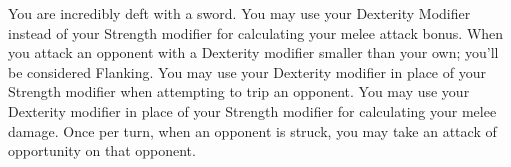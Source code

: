 \combatfeat
{You are incredibly deft with a sword.}
{You may use your Dexterity Modifier instead of your Strength modifier for calculating your melee attack bonus.}
{When you attack an opponent with a Dexterity modifier smaller than your own; you'll be considered Flanking.}
{You may use your Dexterity modifier in place of your Strength modifier when attempting to trip an opponent.}
{You may use your Dexterity modifier in place of your Strength modifier for calculating your melee damage.}
{Once per turn, when an opponent is struck, you may take an attack of opportunity on that opponent.}